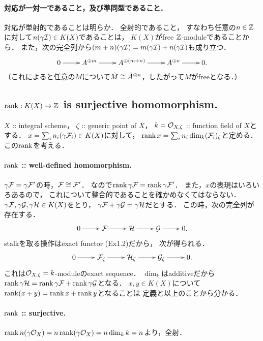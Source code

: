 \documentclass[a4paper]{jsarticle}
\begin{document}
    \paragraph{対応が一対一であること，及び準同型であること．}
    対応が単射的であることは明らか．
    全射的であること，
    すなわち任意の$n \in \mathbb{Z}$に対して$n(\gamma\mathcal{I}) \in K(X)$であることは，
    $K(X)$がfree $\mathbb{Z}$-moduleであることから．
    また，次の完全列から$(m+n) (\gamma \mathcal{I})=m(\gamma \mathcal{I})+n(\gamma \mathcal{I})$も成り立つ．
    \[
        \xymatrix
        {
            0 \ar[r]& A^{\oplus m} \ar[r]& A^{\oplus (m+n)} \ar[r]& A^{\oplus n} \ar[r]& 0.
        }
    \]
    （これによると任意の$M$について$\tilde{M} \cong \tilde{A}^{\oplus n}$，したがって$M$がfreeとなる．）

    \subsection{$\operatorname{rank}: K(X) \to \mathbb{Z}$ is surjective homomorphism.}
    $X$ :: integral scheme，
    $\zeta$ :: generic point of $X$，
    $k=\mathcal{O}_{X, \zeta}$ :: function field of $X$とする．
    $x=\sum_{i} n_i (\gamma \mathcal{F}_i) \in K(X)$に対して，
    $\operatorname{rank} x=\sum_{i} n_i \dim_k (\mathcal{F}_i)_{\zeta}$と定める．
    この$\operatorname{rank}$を考える．

    \paragraph{$\operatorname{rank}$ :: well-defined homomorphism.}
    $\gamma \mathcal{F}=\gamma \mathcal{F}'$の時，$\mathcal{F} \cong \mathcal{F}'$．
    なので$\operatorname{rank} \gamma \mathcal{F}=\operatorname{rank} \gamma \mathcal{F}'$．
    また，$x$の表現はいろいろあるので，
    これについて整合的であることを確かめなくてはならない．
    $\gamma \mathcal{F}, \gamma \mathcal{G}, \gamma \mathcal{H} \in K(X)$をとり，
    $\gamma \mathcal{F}+\gamma \mathcal{G}=\gamma \mathcal{H}$だとする．
    この時，次の完全列が存在する．
    \[
        \xymatrix
        {
            0 \ar[r]& \shF \ar[r]& \shH \ar[r]& \shG \ar[r]& 0.
        }
    \]
    stalkを取る操作はexact functor (Ex1.2)だから，
    次が得られる．
    \[
        \xymatrix
        {
            0 \ar[r]& \shF_{\zeta} \ar[r]& \shH_{\zeta} \ar[r]& \shG_{\zeta} \ar[r]& 0.
        }
    \]
    これは$\mathcal{O}_{X, \zeta}=k$-moduleのexact sequence．
    $\dim_k$はadditiveだから
    $\operatorname{rank} \gamma \mathcal{H}=\operatorname{rank} \gamma \mathcal{F}+\operatorname{rank} \gamma \mathcal{G}$となる．
    $x, y \in K(X)$について$\operatorname{rank} (x+y)=\operatorname{rank} x+\operatorname{rank} y$となることは
    定義と以上のことから分かる．

    \paragraph{$\operatorname{rank}$ :: surjective.}
    $\operatorname{rank} n (\gamma \mathcal{O}_X)=n \operatorname{rank} (\gamma \mathcal{O}_X)=n \dim_k k=n$より，全射．
\end{document}
